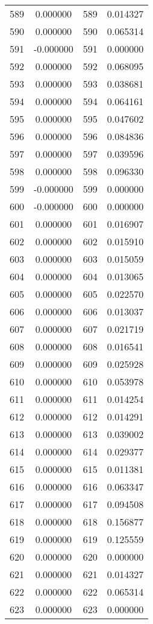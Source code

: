 \documentclass[12pt]{article}
\begin{document}
\begin{longtable}{@{}cccc@{}}
589 & 0.000000 & 589 & 0.014327 \\
590 & 0.000000 & 590 & 0.065314 \\
591 & -0.000000 & 591 & 0.000000 \\
592 & 0.000000 & 592 & 0.068095 \\
593 & 0.000000 & 593 & 0.038681 \\
594 & 0.000000 & 594 & 0.064161 \\
595 & 0.000000 & 595 & 0.047602 \\
596 & 0.000000 & 596 & 0.084836 \\
597 & 0.000000 & 597 & 0.039596 \\
598 & 0.000000 & 598 & 0.096330 \\
599 & -0.000000 & 599 & 0.000000 \\
600 & -0.000000 & 600 & 0.000000 \\
601 & 0.000000 & 601 & 0.016907 \\
602 & 0.000000 & 602 & 0.015910 \\
603 & 0.000000 & 603 & 0.015059 \\
604 & 0.000000 & 604 & 0.013065 \\
605 & 0.000000 & 605 & 0.022570 \\
606 & 0.000000 & 606 & 0.013037 \\
607 & 0.000000 & 607 & 0.021719 \\
608 & 0.000000 & 608 & 0.016541 \\
609 & 0.000000 & 609 & 0.025928 \\
610 & 0.000000 & 610 & 0.053978 \\
611 & 0.000000 & 611 & 0.014254 \\
612 & 0.000000 & 612 & 0.014291 \\
613 & 0.000000 & 613 & 0.039002 \\
614 & 0.000000 & 614 & 0.029377 \\
615 & 0.000000 & 615 & 0.011381 \\
616 & 0.000000 & 616 & 0.063347 \\
617 & 0.000000 & 617 & 0.094508 \\
618 & 0.000000 & 618 & 0.156877 \\
619 & 0.000000 & 619 & 0.125559 \\
620 & 0.000000 & 620 & 0.000000 \\
621 & 0.000000 & 621 & 0.014327 \\
622 & 0.000000 & 622 & 0.065314 \\
623 & 0.000000 & 623 & 0.000000 \\

\end{longtable}
\end{document}
